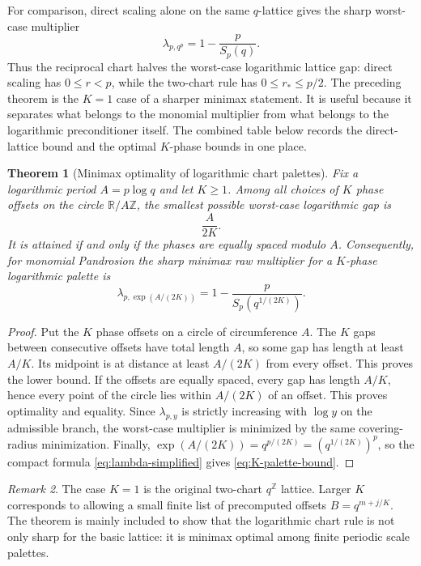 \documentclass[10pt,a4paper]{article}
\theoremstyle{plain}
\newtheorem{theorem}{Theorem}[section]
\theoremstyle{definition}
\theoremstyle{remark}
\newtheorem{remark}[theorem]{Remark}
\newcommand{\R}{\mathbb{R}}
\begin{document}
For comparison, direct scaling alone on the same $q$-lattice gives the sharp
worst-case multiplier
\[
  \lambda_{p,q^p}=1-\frac{p}{S_p(q)}.
\]
Thus the reciprocal chart halves the worst-case logarithmic lattice gap: direct
scaling has $0\le r<p$, while the two-chart rule has $0\le r_*\le p/2$.
The preceding theorem is the $K=1$ case of a sharper minimax statement.  It is
useful because it separates what belongs to the monomial multiplier from what
belongs to the logarithmic preconditioner itself.  The combined table below
records the direct-lattice bound and the optimal $K$-phase bounds in one place.


\begin{theorem}[Minimax optimality of logarithmic chart palettes]
\label{thm:minimax-palette}
Fix a logarithmic period $A=p\log q$ and let $K\ge1$.  Among all choices of
$K$ phase offsets on the circle $\R/A\mathbb Z$, the smallest possible
worst-case logarithmic gap is
\[
  \frac{A}{2K}.
\]
It is attained if and only if the phases are equally spaced modulo $A$.
Consequently, for monomial Pandrosion the sharp minimax raw multiplier for a
$K$-phase logarithmic palette is
\begin{equation}
  \lambda_{p,\exp(A/(2K))}
  =1-\frac{p}{S_p(q^{1/(2K)})}.
  \label{eq:K-palette-bound}
\end{equation}
\end{theorem}

\begin{proof}
Put the $K$ phase offsets on a circle of circumference $A$.  The $K$ gaps
between consecutive offsets have total length $A$, so some gap has length at
least $A/K$.  Its midpoint is at distance at least $A/(2K)$ from every offset.
This proves the lower bound.  If the offsets are equally spaced, every gap has
length $A/K$, hence every point of the circle lies within $A/(2K)$ of an
offset.  This proves optimality and equality.  Since $\lambda_{p,y}$ is
strictly increasing with $\log y$ on the admissible branch, the worst-case
multiplier is minimized by the same covering-radius minimization.  Finally,
$\exp(A/(2K))=q^{p/(2K)}=(q^{1/(2K)})^p$, so the compact formula
\eqref{eq:lambda-simplified} gives \eqref{eq:K-palette-bound}.
\end{proof}

\begin{remark}
The case $K=1$ is the original two-chart $q^{\mathbb Z}$ lattice.  Larger
$K$ corresponds to allowing a small finite list of precomputed offsets
$B=q^{m+j/K}$.  The theorem is mainly included to show that the logarithmic
chart rule is not only sharp for the basic lattice: it is minimax optimal among
finite periodic scale palettes.
\end{remark}
\end{document}
